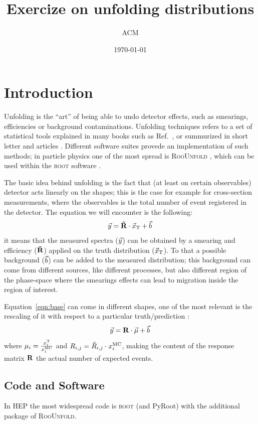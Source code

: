 \documentclass[a4paper,11pt]{article}
\title{Exercize on unfolding distributions}
\author{ACM}
\date{\today}
\begin{document}
\maketitle

\section{Introduction}
Unfolding is the ``art'' of being able to undo detector effects, such as smearings, efficiencies or background contaminations.
Unfolding techniques refers to a set of statistical tools explained in many books such as Ref.~\cite{Cowan}, 
or summurized in short letter and articles \cite{Cowan:unfolding}. 
Different software suites provede an implementation of such methods; 
in particle physics one of the most spread is {\scshape RooUnfold} \cite{RooUnfold}, 
which can be used within the {\scshape root} software \cite{ROOT}. 

The basic idea behind unfolding is the fact that (at least on certain observables) detector acts linearly on the shapes; this is the case for example for cross-section measurements, where the observables is the total number of event registered in the detector.
The equation we will encounter is the following:
\begin{equation}
	\vec{y}= \mathbf{\tilde{R}} \cdot \vec{x}_\textup{T} + \vec{b}
	\label{eqn:base}
\end{equation}
it means that the measured spectra ($\vec{y}$) can be obtained by a smearing and efficiency ($\mathbf{\tilde{R}}$) applied on the truth distribution ($\vec{x}_\textup{T}$). To that a possible background ($\vec{b}$) can be added to the measured distribution; this background can come from different sources, like different processes, but also different region of the phase-space where the smearings effects can lead to migration inside the region of interest.

Equation~\ref{eqn:base} can come in different shapes, one of the most relevant is the rescaling of it with respect to a particular truth/prediction \cite{SVD}:
\begin{equation}
	\vec{y} = \mathbf{R} \cdot \vec{\mu} + \vec{b}
\end{equation}
where $\mu_{i} = \frac{x^\textup{T}_{i}}{x^\textup{MC}_{i}} $ and  $R_{i,j} = \tilde{R}_{i,j} \cdot x^\textup{MC}_{i} $, making the content of the response matrix $\mathbf{R}$ the actual number of expected events.

\subsection{Code and Software}
In HEP the most widespread code is {\scshape root} (and {PyRoot}) with the additional package of {\scshape RooUnfold}.
\end{document}
